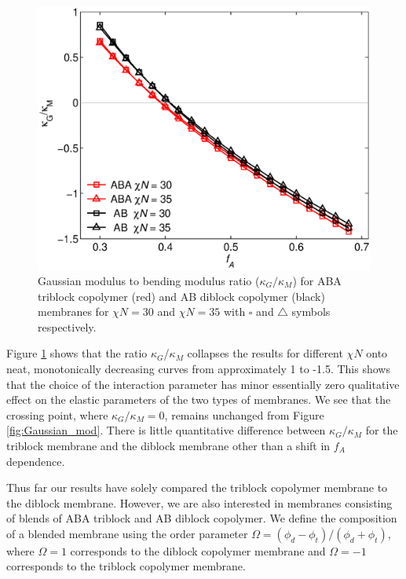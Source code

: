 \documentclass[twocolumn,aps,floatfix,nobibnotes]{revtex4-1}
\begin{document}
\begin{figure}[htp]
\centering
\includegraphics[width=1.0\columnwidth]{kg_km.eps}
\caption{Gaussian modulus to bending modulus ratio ($\kappa_G/\kappa_M$) for ABA triblock copolymer (red) and AB diblock copolymer (black) membranes for $\chi N = 30$ and $\chi N = 35$ with $\square$ and $\triangle$ symbols respectively.}
\label{fig:kg_km}
\centering
\end{figure}

Figure \ref{fig:kg_km} shows that the ratio $\kappa_G$/$\kappa_M$ collapses the results for different $\chi N$ onto neat, monotonically decreasing curves from approximately 1 to -1.5. This shows that the choice of the interaction parameter has minor essentially zero qualitative effect on the elastic parameters of the two types of membranes. We see that the crossing point, where $\kappa_G/\kappa_M = 0$, remains unchanged from Figure \ref{fig:Gaussian_mod}. There is little quantitative difference between $\kappa_G/\kappa_M$ for the triblock membrane and the diblock membrane other than a shift in $f_A$ dependence. 

Thus far our results have solely compared the triblock copolymer membrane to the diblock membrane. However, we are also interested in membranes consisting of blends of ABA triblock and AB diblock copolymer. We define the composition of a blended membrane using the order parameter $\Omega = (\phi_d -\phi_t)/(\phi_d+\phi_t)$, where $\Omega = 1$ corresponds to the diblock copolymer membrane and $\Omega = -1$ corresponds to the triblock copolymer membrane. 
\end{document}
